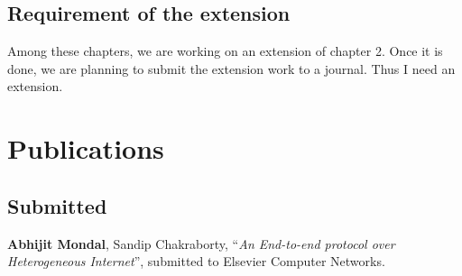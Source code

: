 \subsection{Requirement of the extension}
Among these chapters, we are working on an extension of chapter 2. Once it is done, we are planning to submit the extension work to a journal. Thus I need an extension. 

\section*{Publications}

\subsection*{Submitted}
\begin{enumerate}[start=1,label={[\arabic*]}]
	\item \textbf{Abhijit Mondal}, Sandip Chakraborty, ``\textit{An End-to-end protocol over Heterogeneous Internet}'', submitted to Elsevier Computer Networks.
\end{enumerate}

